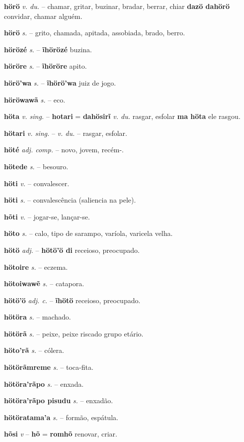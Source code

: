 \textbf{hörö} \textit{v. du.} -- chamar, gritar, buzinar, bradar, berrar, chiar  \textbf{dazö dahörö} convidar, chamar alguém.

\textbf{hörö} \textit{s.} -- grito, chamada, apitada, assobiada, brado, berro.

\textbf{hörözé} \textit{s.} -- \textbf{ĩhörözé} buzina.

\textbf{höröre} \textit{s.} -- \textbf{ĩhöröre} apito.

\textbf{hörö'wa} \textit{s.} -- \textbf{ĩhörö'wa} juiz de jogo.

\textbf{höröwawã} \textit{s.} -- eco.

\textbf{höta} \textit{v. sing.} -- \textbf{hotari} = \textbf{dahösirĩ} \textit{v. du.} rasgar, esfolar  \textbf{ma höta} ele rasgou.

\textbf{hötari} \textit{v. sing.} -- \textit{v. du.} -- rasgar, esfolar.

\textbf{höté} \textit{adj. comp.} -- novo, jovem, recém-.

\textbf{hötede} \textit{s.} -- besouro.

\textbf{höti} \textit{v.} -- convalescer.

\textbf{höti} \textit{s.} -- convalescência (saliencia na pele).

\textbf{hõti} \textit{v.} -- jogar-se, lançar-se.

\textbf{höto} \textit{s.} -- calo, tipo de sarampo, varíola, varicela velha.

\textbf{hötö} \textit{adj.} -- \textbf{hötö'ö di} receioso, preocupado.

\textbf{hötoire} \textit{s.} -- eczema.

\textbf{hötoiwawẽ} \textit{s.} -- catapora.

\textbf{hötö'ö} \textit{adj. c.} -- \textbf{ĩhötö} receioso, preocupado.

\textbf{hötöra} \textit{s.} -- machado.

\textbf{hötörã} \textit{s.} -- peixe, peixe riscado  grupo etário.

\textbf{höto'rã} \textit{s.} -- cólera.

\textbf{hötörãmreme} \textit{s.} -- toca-fita.

\textbf{hötöra'rãpo} \textit{s.} -- enxada.

\textbf{hötöra'rãpo pisudu} \textit{s.} -- enxadão.

\textbf{hötöratama'a} \textit{s.} -- formão, espátula.

\textbf{hõsi} \textit{v} -- \textbf{hõ} = \textbf{romhõ} renovar, criar.

